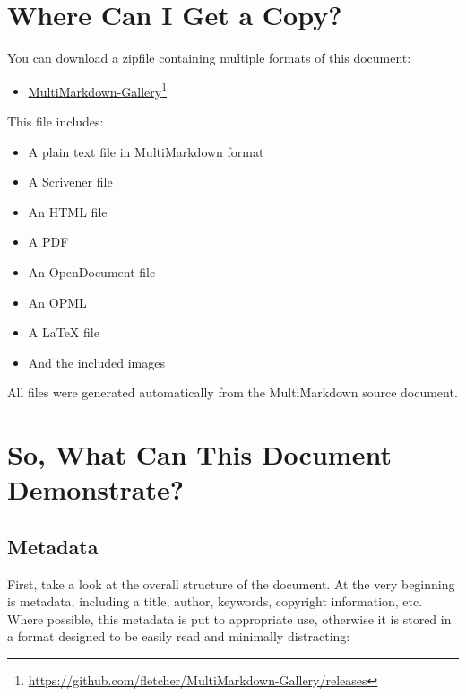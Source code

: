 \chapter{Where Can I Get a Copy?}
\label{wherecanigetacopy}

You can download a zipfile containing multiple formats of this document:

\begin{itemize}
\item \href{https://github.com/fletcher/MultiMarkdown-Gallery/releases}{MultiMarkdown-Gallery}\footnote{\href{https://github.com/fletcher/MultiMarkdown-Gallery/releases}{https:/\slash github.com\slash fletcher\slash MultiMarkdown-Gallery\slash releases}}

\end{itemize}

This file includes:

\begin{itemize}
\item A plain text file in MultiMarkdown format

\item A Scrivener file

\item An HTML file

\item A PDF

\item An OpenDocument file

\item An OPML

\item A LaTeX file

\item And the included images

\end{itemize}

All files were generated automatically from the MultiMarkdown source document.

\chapter{So, What Can This Document Demonstrate?}
\label{sowhatcanthisdocumentdemonstrate}

\section{Metadata}
\label{metadata}

First, take a look at the overall structure of the document. At the very
beginning is metadata, including a title, author, keywords, copyright
information, etc. Where possible, this metadata is put to appropriate use,
otherwise it is stored in a format designed to be easily read and minimally
distracting:

